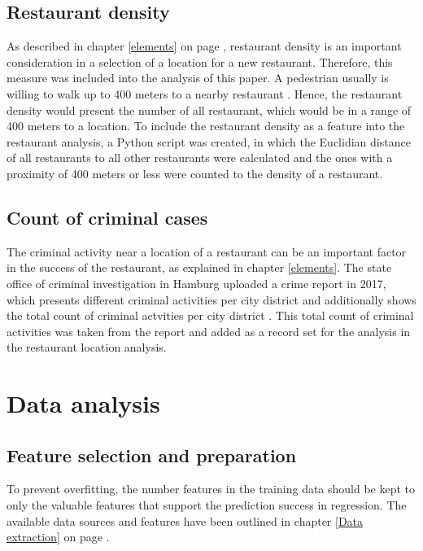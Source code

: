 \documentclass[a4paper, 11pt, oneside]{Thesis}  %
\begin{document}
\section{Restaurant density}
\label{restaurant_density}

As described in chapter \ref{elements} on page \pageref{elements}, restaurant density is an important consideration in a selection of a location for a new restaurant. Therefore, this measure was included into the analysis of this paper. A pedestrian usually is willing to walk up to 400 meters to a nearby restaurant \cite{Yang.2012b}. Hence, the restaurant density would present the number of all restaurant, which would be in a range of 400 meters to a location. To include the restaurant density as a feature into the restaurant analysis, a Python script was created, in which the Euclidian distance of all  restaurants to all other restaurants were calculated and the ones with a proximity of 400 meters or less were counted to the density of a restaurant.

\section{Count of criminal cases}
\label{criminal_count}

The criminal activity near a location of a restaurant can be an important factor in the success of the restaurant, as explained in chapter \ref{elements}. The state office of criminal investigation in Hamburg uploaded a crime report in 2017, which presents different criminal activities per city district and additionally shows the total count of criminal actvities per city district \cite{LandeskriminalamtHamburg.2017}. This total count of criminal activities was taken from the report and added as a record set for the analysis in the restaurant location analysis.

\chapter{Data analysis}

\section{Feature selection and preparation}
\label{sec:Feature_selection}

To prevent overfitting, the number features in the training data should be kept to only the valuable features that support the prediction success in regression. The available data sources and features have been outlined in chapter \ref{Data extraction} on page \pageref{Data extraction}. 
\end{document}
